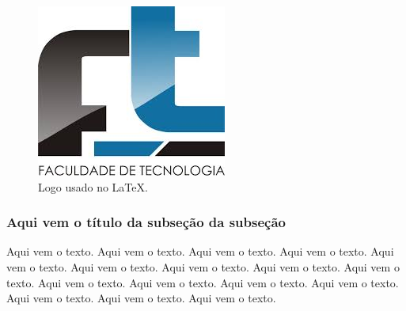 \documentclass[a4paper, 12pt]{article}
\begin{document}
\begin{figure}[htb]
    \centering
    \includegraphics[scale=0.2]{imagens/logotipo.jpeg}
    \caption{Logo usado no \LaTeX.} %
    \label{figura-leao}
\end{figure}

\subsubsection{Aqui vem o título da subseção da subseção}

Aqui vem o texto. Aqui vem o texto. Aqui vem o texto. Aqui vem o texto. 
Aqui vem o texto. Aqui vem o texto. Aqui vem o texto. Aqui vem o texto. 
Aqui vem o texto. Aqui vem o texto. Aqui vem o texto. Aqui vem o texto. 
Aqui vem o texto. Aqui vem o texto. Aqui vem o texto. Aqui vem o texto. 

\newpage
\end{document}

